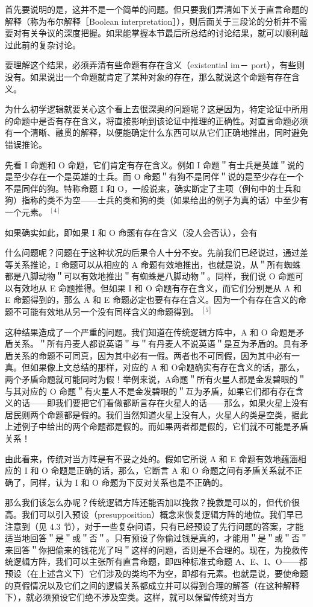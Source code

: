 首先要说明的是，这并不是一个简单的问题。但只要我们弄清如下关于直言命题的解释（称为布尔解释［Boolean interpretation］），则后面关于三段论的分析并不需要对有关争议的深度把握。如果能掌握本节最后所总结的讨论结果，就可以顺利越过此前的复杂讨论。

要理解这个结果，必须弄清有些命题有存在含义（existential im－ port），有些则没有。如果说出一个命题就肯定了某种对象的存在，那么就说这个命题有存在含义。

为什么初学逻辑就要关心这个看上去很深奥的问题呢？这是因为，特定论证中所用的命题中是否有存在含义，将直接影响到该论证中推理的正确性。对直言命题必须有一个清晰、融贯的解释，以便能确定什么东西可以从它们正确地推出，同时避免错误推论。

先看 I 命题和 O 命题，它们肯定有存在含义。例如 I 命题＂有士兵是英雄＂说的是至少存在一个是英雄的士兵。而 O 命题＂有狗不是同伴＂说的是至少存在一个不是同伴的狗。特称命题 I 和 O，一般说来，确实断定了主项（例句中的士兵和狗）指称的类不为空——士兵的类和狗的类（如果给出的例子为真的话）中至少有一个元素。 ${ }^{[4]}$

如果确实如此，即如果 I 和 O 命题有存在含义（没人会否认），会有

什么问题呢？问题在于这种状况的后果令人十分不安。先前我们已经说过，通过差等关系推论，I 命题可以从相应的 A 命题有效地推出，也就是说，从＂所有蜘蛛都是八脚动物＂可以有效地推出＂有蜘蛛是八脚动物＂。同样，我们说 O 命题可以有效地从 E 命题推得。但如果 I 和 O 命题有存在含义，而它们分别是从 A 和 E 命题得到的，那么 A 和 E 命题必定也要有存在含义。因为一个有存在含义的命题不可能有效地从另一个没有同样含义的命题得到。 ${ }^{[5]}$

这种结果造成了一个严重的问题。我们知道在传统逻辑方阵中，A 和 O 命题是矛盾关系。＂所有丹麦人都说英语＂与＂有丹麦人不说英语＂是互为矛盾的。具有矛盾关系的命题不可同真，因为其中必有一假。两者也不可同假，因为其中必有一真。但如果像上文总结的那样，对应的 A 和 O命题确实有存在含义的话，那么，两个矛盾命题就可能同时为假！举例来说，A命题＂所有火星人都是金发碧眼的＂与其对应的 O 命题＂有火星人不是金发碧眼的＂互为矛盾，如果它们都有存在含义的话——即我们要把它们看做都断言存在火星人的话——那么，如果火星上没有居民则两个命题都是假的。我们当然知道火星上没有人，火星人的类是空类，据此上述例子中给出的两个命题都是假的。而如果两者都是假的，它们就不可能是矛盾关系！

由此看来，传统对当方阵是有不妥之处的。假如它所说 A 和 E 命题有效地蕴涵相应的 I 和 O 命题是正确的话，那么，它断言 A 和 O 命题之间有矛盾关系就不正确了，同样，认为 I 和 O 命题为下反对关系也是不正确的。

那么我们该怎么办呢？传统逻辑方阵还能否加以挽救？挽救是可以的，但代价很高。我们可以引入预设（presupposition）概念来恢复逻辑方阵的地位。我们早已注意到（见 4.3 节），对于一些复杂问语，只有已经预设了先行问题的答案，才能适当地回答＂是＂或＂否＂。只有预设了你偷过钱是真的，才能用＂是＂或＂否＂来回答＂你把偷来的钱花光了吗＂这样的问题，否则是不合理的。现在，为挽救传统逻辑方阵，我们可以主张所有直言命题，即四种标准式命题 A、E、I、O——都预设（在上述含义下）它们涉及的类均不为空，即都有元素。也就是说，要使命题的真假情况以及它们之间的逻辑关系都成立并可以得到合理的解答（在这种解释下），就必须预设它们绝不涉及空类。这样，就可以保留传统对当方

